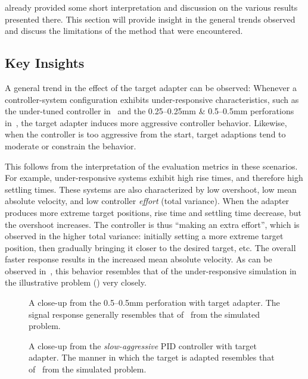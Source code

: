  already provided some short interpretation and discussion on the various results presented there.
This section will provide insight in the general trends observed and discuss the limitations of the method that were encountered.

\subsection{Key Insights}\label{subsec:key-insights}
A general trend in the effect of the target adapter can be observed: Whenever a controller-system configuration
exhibits under-responsive characteristics, such as the under-tuned controller in~ and the 0.25--0.25\si{\mm} \& 0.5--0.5\si{\mm} perforations in~, the target adapter induces more aggressive controller behavior.
Likewise, when the controller is too aggressive from the start, target adaptions tend to moderate or constrain the behavior.

This follows from the interpretation of the evaluation metrics in these scenarios.
For example, under-responsive systems exhibit high rise times, and therefore high settling times.
These systems are also characterized by low overshoot, low mean absolute velocity, and low controller \emph{effort} (total variance).
When the adapter produces more extreme target positions, rise time and settling time decrease, but the overshoot increases.
The controller is thus ``making an extra effort'', which is observed in the higher total variance: initially setting a more extreme target position, then gradually bringing it closer to the desired target, etc.
The overall faster response results in the increased mean absolute velocity.
As can be observed in~, this behavior resembles that of the under-responsive simulation in the illustrative problem () very closely.

\begin{figure}
    \centering
    
    \vspace*{-2em}
    \caption{A close-up from the 0.5--0.5\si{\mm} perforation with target adapter.
    The signal response generally resembles that of~ from the simulated problem.}
    \label{fig:under-tuned-closeup}
\end{figure}

\begin{figure}
    \centering
    
    \vspace*{-2em}
    \caption{A close-up from the \emph{slow-aggressive} PID controller with target adapter.
    The manner in which the target is adapted resembles that of~ from the simulated problem.}
    \label{fig:slow-overshoot-closeup}
\end{figure}

